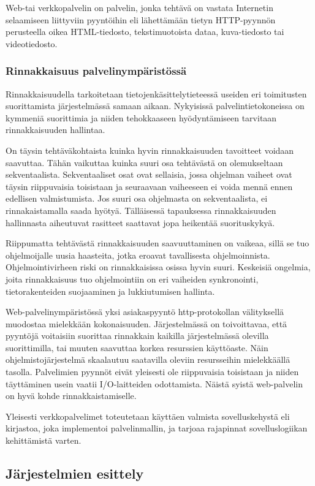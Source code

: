 \documentclass[12pt]{article}
\begin{document}
Web-tai verkkopalvelin on palvelin, jonka tehtävä on vastata Internetin
selaamiseen liittyviin pyyntöihin eli lähettämään tietyn HTTP-pyynnön
perusteella oikea HTML-tiedosto, tekstimuotoista dataa, kuva-tiedosto
tai videotiedosto.
\subsubsection{Rinnakkaisuus palvelinympäristössä}

Rinnakkaisuudella tarkoitetaan tietojenkäsittelytieteessä useiden
eri toimitusten suorittamista järjestelmässä samaan aikaan.
Nykyisissä palvelintietokoneissa on kymmeniä suorittimia ja niiden tehokkaaseen
hyödyntämiseen tarvitaan rinnakkaisuuden hallintaa.

On täysin tehtäväkohtaista
kuinka hyvin rinnakkaisuuden tavoitteet voidaan saavuttaa.
Tähän vaikuttaa kuinka suuri osa tehtävästä on olemukseltaan sekventaalista.
Sekventaaliset osat ovat sellaisia, jossa ohjelman vaiheet ovat täysin
riippuvaisia toisistaan ja seuraavaan vaiheeseen ei voida mennä ennen edellisen
valmistumista. Jos suuri osa ohjelmasta on sekventaalista, ei rinnakaistamalla
saada hyötyä. Tälläisessä tapauksessa rinnakkaisuuden hallinnasta aiheutuvat
rasitteet saattavat jopa heikentää suorituskykyä.

Riippumatta tehtävästä rinnakkaisuuden saavuuttaminen on vaikeaa,
sillä se tuo ohjelmoijalle uusia haasteita, jotka eroavat tavallisesta
ohjelmoinnista. Ohjelmointivirheen riski on rinnakkaisissa osissa hyvin suuri.
Keskeisiä ongelmia, joita rinnakkaisuus tuo ohjelmointiin on eri vaiheiden
synkronointi, tietorakenteiden suojaaminen ja lukkiutumisen hallinta.

Web-palvelinympäristössä yksi asiakaspyyntö http-protokollan välityksellä
muodostaa mielekkään kokonaisuuden.
Järjestelmässä on toivoittavaa, että pyyntöjä voitaisiin suorittaa
rinnakkain kaikilla järjestelmässä olevilla suorittimilla, tai muuten 
saavuttaa korkea resurssien käyttöaste.
Näin ohjelmistojärjestelmä skaalautuu saatavilla oleviin resursseihin
mielekkäällä tasolla. Palvelimien pyynnöt eivät yleisesti ole riippuvaisia
toisistaan ja niiden täyttäminen usein vaatii I/O-laitteiden odottamista.
Näistä syistä web-palvelin on hyvä kohde rinnakkaistamiselle.

Yleisesti verkkopalvelimet toteutetaan käyttäen valmista sovelluskehystä eli kirjastoa,
joka implementoi palvelinmallin, ja tarjoaa rajapinnat sovelluslogiikan
kehittämistä varten.

\subsection{Järjestelmien esittely}
\end{document}
